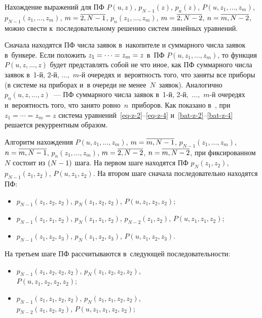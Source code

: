 \begin{multicols}{2}
Нахождение выражений для ПФ $P(u,z)$, $p_{N-1}(z)$, $p_{n}(z)$, 
$P(u,z_1,\ldots,z_{m})$,  $p_{N-1}(z_1,\ldots,z_{m})$, $m\hm=\overline{2,N-1}$, 
$p_{n}(z_1,\ldots,z_{m})$, $m\hm=\overline{2,N-2}$, $n\hm=\overline{m,N-2}$,
можно свести к~последовательному решению систем линейных уравнений.

Сначала находятся ПФ числа заявок в~накопителе
и суммарного числа заявок в~бункере.
Если положить $z_1\hm=\cdots=z_m\hm=z$ в~ПФ
$P(u,z_1,\ldots,z_{m})$, то функция
$P(u,z,\ldots,z)$ будет представлять собой
не что иное, как ПФ суммарного числа заявок 
в~\mbox{1-й}, \mbox{2-й}, $\ldots,$ $m$-й очередях 
и~вероятность того, что заняты все приборы (в системе
на приборах и~в очереди не менее~$N$~заявок).
Аналогично $p_n(u,z,\ldots,z)$~---
ПФ суммарного числа заявок в~\mbox{1-й}, \mbox{2-й},\
$\ldots,$ $m$-й очередях и~вероятность того, что
занято ровно~$n$~приборов.
Как показано в~\cite{p1},
при $z_1=\cdots=z_m=z$ система уравнений~\eqref{eq-z-2}--\eqref{eq-z-4}
и~\eqref{bat-z-2}--\eqref{bat-z-4} решается рекуррентным образом.

Алгоритм нахождения
$P(u,z_1,\ldots,z_{m})$, $m\hm=\overline{m,N-1}$,  $p_{N-1}(z_1,\ldots,z_{m})$, 
$n\hm=\overline{m,N-1}$, $p_{n}(z_1,\ldots,z_{m})$, $m\hm=\overline{2,N-2}$, 
$n\hm=\overline{m,N-2}$,
при фиксированном~$N$ состоит из $(N\hm-1)$ шага.
На первом шаге находятся ПФ    $p_{N}(z_1,z_{2})$, $p_{N-1}(z_1,z_2)$, $P(u,z_1,z_2)$.
На втором шаге сначала последовательно находятся ПФ:
\begin{itemize}
\item $p_{N-1}(z_1,z_2,z_2)$,  $p_{N}(z_1,z_{2},z_2)$, $P(u,z_1,z_2,z_2)$;

\item $p_{N-1}(z_1,z_1,z_2)$,  $p_{N}(z_1,z_{1},z_2)$, $p_{N-2}(z_1,z_2)$, $P(u,z_1,z_1,z_2)$;

\item $p_{N-1}(z_1,z_2,z_3)$,  $p_{N}(z_1,z_{2},z_3)$, $P(u,z_1,z_2,z_3)$.
\end{itemize}

На третьем шаге ПФ рассчитываются в~сле\-ду\-ющей последовательности:
\begin{itemize}

\item $p_{N-1}(z_1,z_2,z_2,z_2)$, $p_{N}(z_1,z_{2},z_2,z_2)$,\\
 $P(u,z_1,z_2,z_2,z_2)$;

\item $p_{N-1}(z_1,z_1,z_2,z_2)$,  $p_{N}(z_1,z_{1},z_2,z_2)$,\\
 $p_{N-2}(z_1,z_2,z_2)$, $P(u,z_1,z_1,z_2,z_2)$;


\end{itemize}
\end{multicols}
